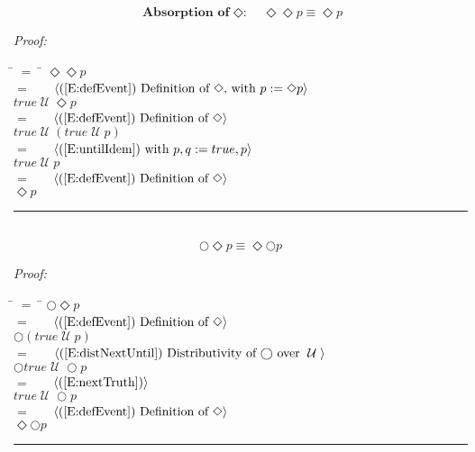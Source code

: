 \documentclass[fleqn, leqno]{article}
\newcommand{\lgap}{2pt}                             %
\newcommand{\mymathindent}{24pt}                      %
\newcommand{\Until}{\;\mathcal{U}\;}
\newcommand{\Next}{\bigcirc}
\newcommand{\Event}{\Diamond}
\newcommand{\myqed}{\hfill\rule[-.23ex]{1.2ex}{2.0ex}}
\newcommand{\Gll} {\langle}                         %
\newcommand{\Ggg} {\rangle}                         %
\newcommand{\Hint}[1]     {\ \ \ $\Gll              \mbox{#1} \Ggg$ }   %
\begin{document}
\begin{equation}\label{E:IdemEvent}
\textbf{Absorption of $\Event$:}\quad \Event\Event p \equiv \Event p
\end{equation}

\emph{Proof:}
\begin{tabbing}
\hspace{\mymathindent} \= $= \;$ \= \kill
  \> \>   $\Event\Event p$\\[\lgap]
  \> $=$  \>  \Hint{(\ref{E:defEvent}) Definition of $\Event$, with $p := \Event p$}\\[\lgap]
  \> \>   $true \Until \Event p$\\[\lgap]
  \> $=$  \>  \Hint{(\ref{E:defEvent}) Definition of $\Event$}\\[\lgap]
  \> \>   $true \Until (true \Until p)$\\[\lgap]
  \> $=$  \>  \Hint{(\ref{E:untilIdem}) with $p,q := true,p$}\\[\lgap]
  \> \>   $true \Until p$\\[\lgap]
  \> $=$  \>  \Hint{(\ref{E:defEvent}) Definition of $\Event$}\\[\lgap]
  \> \>   $\Event p$\\[\lgap]
\end{tabbing}
\myqed\\[\lgap]


\begin{equation}\label{E:dNextEvent}
\Next\Event p \equiv \Event\Next p
\end{equation}

\emph{Proof:}
\begin{tabbing}
\hspace{\mymathindent} \= $= \;$ \= \kill
  \> \>   $\Next\Event p$\\[\lgap]
  \> $=$  \>  \Hint{(\ref{E:defEvent}) Definition of $\Event$}\\[\lgap]
  \> \>   $\Next(true \Until p)$\\[\lgap]
  \> $=$  \>  \Hint{(\ref{E:distNextUntil}) Distributivity of $\Next$ over $\Until$}\\[\lgap]
  \> \>   $\Next true \Until \Next p$\\[\lgap]
  \> $=$  \>  \Hint{(\ref{E:nextTruth})}\\[\lgap]
  \> \>   $true \Until \Next p$\\[\lgap]
  \> $=$  \>  \Hint{(\ref{E:defEvent}) Definition of $\Event$}\\[\lgap]
  \> \>   $\Event\Next p$\\[\lgap]
\end{tabbing}
\myqed\\[\lgap]
\end{document}
